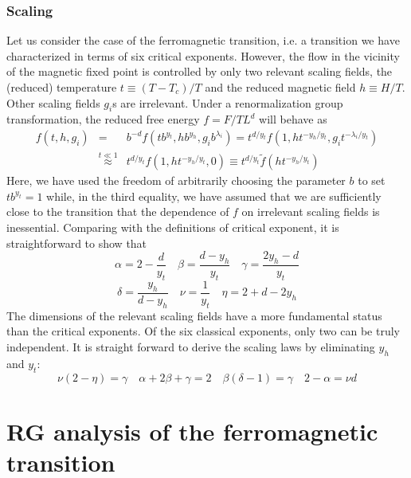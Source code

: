 \subsubsection{Scaling}
Let us consider the case of the ferromagnetic transition, i.e. a transition we have characterized in terms of six critical exponents. 
However, the flow in the vicinity of the magnetic fixed point is controlled by only two relevant scaling fields, the (reduced) temperature $t \equiv (T-T_c)/T$ and the reduced magnetic field $h \equiv H/T$. Other scaling fields $g_i$s are irrelevant.
Under a renormalization group transformation, the reduced free energy $f = F/TL^d$ will behave as
\begin{eqnarray}
f(t,h,g_i) &=& b^{-d}f(tb^{y_t}, hb^{y_h},g_ib^{\lambda_i}) = t^{d/y_t} f(1,ht^{-y_h/y_t},g_it^{-\lambda_i/y_t}) \nonumber \\ 
&\overset{t\ll1}{\approx}& t^{d/y_t} f(1,ht^{-y_h/y_t},0) \equiv t^{d/y_t}\tilde{f}(ht^{-y_h/y_t}) \nonumber
\end{eqnarray}
Here, we have used the freedom of arbitrarily choosing the parameter $b$ to set $tb^{y_t} = 1$ while, in the third equality, we have assumed that we are sufficiently close to the transition that the dependence of $f$ on irrelevant scaling fields is inessential.
Comparing with the definitions of critical exponent, it is straightforward to show that
\[\alpha = 2 - \frac{d}{y_t} \quad \beta = \frac{d-y_h}{y_t} \quad \gamma = \frac{2y_h-d}{y_t} \]
\[\delta = \frac{y_h}{d - y_h} \quad \nu = \frac{1}{y_t} \quad \eta = 2 + d - 2y_h\]
The dimensions of the relevant scaling fields have a more fundamental status than the critical exponents.
Of the six classical exponents, only two can be truly
independent. It is straight forward to derive the scaling laws by eliminating $y_h$ and $y_t$:
\[\nu(2-\eta) = \gamma \quad \alpha + 2\beta + \gamma = 2 \quad \beta(\delta - 1) = \gamma \quad 2 - \alpha = \nu d\]

\section{RG analysis of the ferromagnetic transition}
